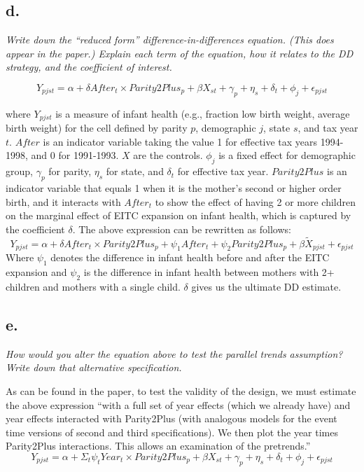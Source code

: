 \documentclass[
]{article}
\begin{document}
\hypertarget{d.-2}{%
\subsection{d.~}\label{d.-2}}

\textit{Write down the “reduced form” difference-in-differences equation. (This does appear in the paper.) Explain each term of the equation, how it relates to the DD strategy, and the coefficient of interest.}

\[Y_{pjst} = \alpha + \delta After_{t} \times Parity2Plus_{p} + \beta X_{st} + \gamma_p + \eta_s + \delta_t + \phi_j + \epsilon_{pjst}\]

where \(Y_{pjst}\) is a measure of infant health (e.g., fraction low
birth weight, average birth weight) for the cell defined by parity
\(p\), demographic \(j\), state \(s\), and tax year \(t\). \(After\) is
an indicator variable taking the value 1 for effective tax years
1994-1998, and 0 for 1991-1993. \(X\) are the controls. \(\phi_j\) is a
fixed effect for demographic group, \(\gamma_p\) for parity, \(\eta_s\)
for state, and \(\delta_t\) for effective tax year. \(Parity2Plus\) is
an indicator variable that equals 1 when it is the mother's second or
higher order birth, and it interacts with \(After_{t}\) to show the
effect of having 2 or more children on the marginal effect of EITC
expansion on infant health, which is captured by the coefficient
\(\delta\). The above expression can be rewritten as follows:
\[Y_{pjst} = \alpha + \delta After_t \times Parity2Plus_p + \psi_1 After_t + \psi_2 Parity2Plus_p + \beta \tilde{X}_{pjst} + \epsilon_{pjst}\]
Where \(\psi_1\) denotes the difference in infant health before and
after the EITC expansion and \(\psi_2\) is the difference in infant
health between mothers with 2+ children and mothers with a single child.
\(\delta\) gives us the ultimate DD estimate.

\hypertarget{e.-2}{%
\subsection{e.}\label{e.-2}}

\textit{How would you alter the equation above to test the parallel trends assumption? Write down that alternative specification.}

As can be found in the paper, to test the validity of the design, we
must estimate the above expression ``with a full set of year effects
(which we already have) and year effects interacted with Parity2Plus
(with analogous models for the event time versions of second and third
specifications). We then plot the year times Parity2Plus interactions.
This allows an examination of the pretrends.''
\[Y_{pjst} = \alpha + \Sigma_{t} \psi_tYear_t\times Parity2Plus_p + \beta X_{st} + \gamma_p + \eta_s + \delta _t + \phi _j + \epsilon_{pjst}\]
\end{document}
